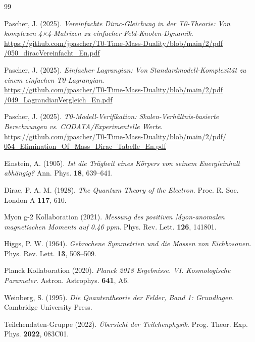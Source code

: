\begin{thebibliography}{99}
	
	Pascher, J. (2025). \textit{Vereinfachte Dirac-Gleichung in der T0-Theorie: Von komplexen 4×4-Matrizen zu einfacher Feld-Knoten-Dynamik}. \\
	\href{https://github.com/jpascher/T0-Time-Mass-Duality/blob/main/2/pdf/050_diracVereinfacht_En.pdf}{https://github.com/jpascher/T0-Time-Mass-Duality/blob/main/2/pdf\\/050\_diracVereinfacht\_En.pdf}
	
	Pascher, J. (2025). \textit{Einfacher Lagrangian: Von Standardmodell-Komplexität zu einem einfachen T0-Lagrangian}. \\
	\href{https://github.com/jpascher/T0-Time-Mass-Duality/blob/main/2/pdf/049_LagrandianVergleich_En.pdf}{https://github.com/jpascher/T0-Time-Mass-Duality/blob/main/2/pdf\\/049\_LagrandianVergleich\_En.pdf}
	
	Pascher, J. (2025). \textit{T0-Modell-Verifikation: Skalen-Verhältnis-basierte Berechnungen vs. CODATA/Experimentelle Werte}. \\
	\href{https://github.com/jpascher/T0-Time-Mass-Duality/blob/main/2/pdf/054_Elimination_Of_Mass_Dirac_Tabelle_En.pdf}{https://github.com/jpascher/T0-Time-Mass-Duality/blob/main/2/pdf/\\054\_Elimination\_Of\_Mass\_Dirac\_Tabelle\_En.pdf}
	
	Einstein, A. (1905). \textit{Ist die Trägheit eines Körpers von seinem Energieinhalt abhängig?} Ann. Phys. \textbf{18}, 639--641.
	
	Dirac, P. A. M. (1928). \textit{The Quantum Theory of the Electron}. Proc. R. Soc. London A \textbf{117}, 610.
	
	Myon g-2 Kollaboration (2021). \textit{Messung des positiven Myon-anomalen magnetischen Moments auf 0.46 ppm}. Phys. Rev. Lett. \textbf{126}, 141801.
	
	Higgs, P. W. (1964). \textit{Gebrochene Symmetrien und die Massen von Eichbosonen}. Phys. Rev. Lett. \textbf{13}, 508--509.
	
	Planck Kollaboration (2020). \textit{Planck 2018 Ergebnisse. VI. Kosmologische Parameter}. Astron. Astrophys. \textbf{641}, A6.
	
	Weinberg, S. (1995). \textit{Die Quantentheorie der Felder, Band 1: Grundlagen}. Cambridge University Press.
	
	Teilchendaten-Gruppe (2022). \textit{Übersicht der Teilchenphysik}. Prog. Theor. Exp. Phys. \textbf{2022}, 083C01.
	
\end{thebibliography}